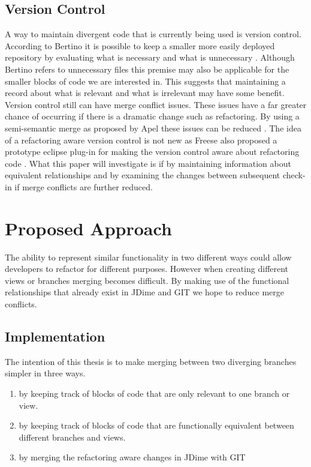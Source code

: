 \documentclass[12pt]{CRPITStyle}
\renewcommand{\cite}{\citep}
\begin{document}
\subsection{Version Control} 
A way to maintain divergent code that is currently being used is version control. According to Bertino it is possible to keep a smaller more easily deployed repository by evaluating what is necessary and what is unnecessary \cite{Bertino2012}. Although Bertino refers to unnecessary files this premise may also be applicable for the smaller blocks of code we are interested in. This suggests that maintaining a record about what is relevant and what is irrelevant may have some benefit. Version control still can have merge conflict issues. These issues have a far greater chance of occurring if there is a dramatic change such as refactoring. By using a semi-semantic merge as proposed by Apel these issues can be reduced \cite{Apel2011}. The idea of a refactoring aware version control is not new as Freese also proposed a prototype eclipse plug-in for making the version control aware about refactoring code \cite{Freese2006}. What this paper will investigate is if by maintaining information about equivalent relationships and by examining the changes between subsequent check-in if merge conflicts are further reduced. 
\section{Proposed Approach}
The ability to represent similar functionality in two different ways could allow developers to refactor for different purposes. However when creating different views or branches merging becomes difficult. By making use of the functional relationships that already exist in JDime and GIT we hope to reduce merge conflicts.  

\subsection{Implementation}

The intention of this thesis is to make merging between two diverging branches simpler in three ways. 

\begin{enumerate}

 \item by keeping track of blocks of code that are only relevant to one branch or view.
 \item by keeping track of blocks of code that are functionally equivalent between different branches and views.
 \item by merging the refactoring aware changes in JDime with GIT

\end{enumerate}
\end{document}
